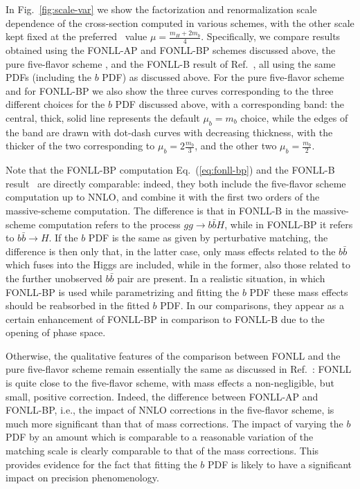 In Fig.~\ref{fig:scale-var} we show the factorization and
renormalization scale dependence of the cross-section computed in
various schemes, with the other scale kept fixed at the
preferred~\cite{Forte:2015hba,Forte:2016sja} value
$\mu=\frac{m_H+2m_b}{4}$.
Specifically, we compare results obtained using the FONLL-AP and
FONLL-BP schemes discussed above, the pure five-flavor scheme , and
the FONLL-B result of Ref.~\cite{Forte:2016sja}, all using the same
PDFs (including the $b$ PDF) as discussed above. For the pure
five-flavor scheme and for FONLL-BP we also show
the three curves corresponding to the three different choices for the
$b$ PDF discussed above, with a corresponding band:
the central, thick, solid line represents the default $\mu_b=m_b$
choice, while the edges of the band are drawn with dot-dash curves
with decreasing thickness, with the thicker of the two corresponding
to $\mu_b=2\frac{m_b}{3}$, and the other two $\mu_b=\frac{m_b}{2}$.

Note that the
FONLL-BP computation Eq.~(\ref{eq:fonll-bp}) and the FONLL-B
result~\cite{Forte:2016sja} are directly comparable: indeed, they both
include the five-flavor scheme computation up to NNLO, and combine it
with the first
two orders of the massive-scheme computation. The difference is that
in FONLL-B in the massive-scheme computation refers to the process
$gg\to b\bar b H$, while in FONLL-BP it refers to  $b\bar b \to H$. If
the $b$ PDF is the same as given by perturbative matching, the
difference is then only that, in the latter case, only mass effects
related to the $b\bar b$ which fuses into the Higgs are included,
while in the former, also those related to the further unobserved
$b\bar b$ pair are present. In a realistic situation, in which FONLL-BP is used
while parametrizing and fitting the $b$ PDF these mass effects should
be reabsorbed in the fitted $b$ PDF. In our comparisons, they 
appear as a certain enhancement of FONLL-BP in comparison to FONLL-B
due to the opening of phase space. 


Otherwise, the qualitative features of the comparison between FONLL
and the pure five-flavor scheme remain essentially the same as discussed
in Ref.~\cite{Forte:2016sja}: FONLL is quite close to the
five-flavor scheme, with mass effects a non-negligible, but small,
positive correction. Indeed, the difference between
FONLL-AP and FONLL-BP, i.e., the impact of NNLO corrections in the
five-flavor scheme, is much more significant than that of mass corrections.
The impact of varying the $b$ PDF by
an amount which is comparable to a reasonable variation of the
matching scale is clearly comparable to that of the mass
corrections. This provides evidence for the fact that fitting the $b$
PDF is likely to have a significant impact on precision phenomenology.


